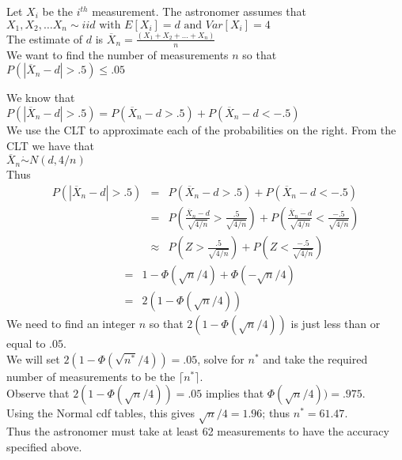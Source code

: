 \documentclass[20pt,landscape]{foils}
\newcommand{\no}{\noindent}
\newcommand{\bul}{\hspace*{.3in}{\textcolor{red}{$\bullet$ \ }}}
\begin{document}
\no \hspace*{.5in} Let $X_i$ be the $i^{th}$ measurement. The astronomer assumes that \\[.1in]
\no \hspace*{1in} $ X_1,X_2,\ldots X_n \sim iid \mbox{ with } E[X_i]=d \mbox{ and } Var[X_i]=4$\\[.1in]
\no \hspace*{2in}The estimate of $d$ is $\overline{X}_n=\frac{(X_1+X_2+\dots+X_n)}{n}$\\[.1in]
\no \hspace*{.5in} We want to find the number of measurements $n$ so that\\[.1in]
\no  \hspace*{3in} $ P(|\overline{X}_n-d|>.5)\le .05$

\foilhead[-.75in]{\textcolor{blue}{ CLT Big Example (cont'd)}}
\no We know that \\[.1in]
\no \hspace*{1in} $P(|\overline{X}_n-d|>.5) =P(\overline{X}_n-d>.5)+P(\overline{X}_n-d<-.5)$\\[.1in]
\no We use the CLT to approximate each of the probabilities on the right. From the CLT we have that\\[.1in]
\no \hspace*{3in} $ \overline{X}_n \dot{\sim} N(d,4/n)$\\[.1in]
Thus 
\begin{eqnarray*}
 P(|\overline{X}_n-d|>.5) &= &P(\overline{X}_n-d>.5)+P(\overline{X}_n-d<-.5)\\
 &=& P\left(\frac{\overline{X}_n-d}{\sqrt{4/n}}>\frac{.5}{\sqrt{4/n}}\right)+
 P\left(\frac{\overline{X}_n-d}{\sqrt{4/n}}<\frac{-.5}{\sqrt{4/n}}\right)\\
 & \approx & P\left(Z>\frac{.5}{\sqrt{4/n}}\right)+P\left(Z<\frac{-.5}{\sqrt{4/n}}\right)
\end{eqnarray*} 
\foilhead[-.75in]{\textcolor{blue}{ CLT Big Example (cont'd)}}
\begin{eqnarray*} 
 &=& 1- \Phi(\sqrt{n}/4)+\Phi(-\sqrt{n}/4)\\
 &=& 2(1-\Phi(\sqrt{n}/4))
\end{eqnarray*}
\no \bul We need to find an integer $n$ so that $2(1-\Phi(\sqrt{n}/4))$ is just less than or equal to $.05$.\\[.1in]
\no \bul We will set $2(1-\Phi(\sqrt{n^*}/4))=.05$, solve for $n^*$ and take the required number of 
measurements to be the $\lceil n^* \rceil$.\\[.1in]
\no \bul Observe that $2(1-\Phi(\sqrt{n}/4))=.05$ implies that $\Phi(\sqrt{n}/4))=.975$.\\[.1in] 
\no \bul Using the Normal cdf tables, this gives $\sqrt{n}/4=1.96$; thus $n^*=61.47$. \\[.1in]
\no \bul Thus the astronomer must take at least 62 measurements to have the accuracy specified above.
\end{document}
